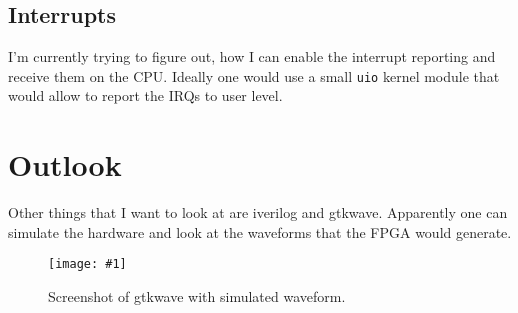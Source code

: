 \documentclass[%
  DIV19]{scrartcl}
\newcommand{\bild}[1]{\texttt{[image: \#1]}}
\begin{document}
\subsection{Interrupts}
I'm currently trying to figure out, how I can enable the interrupt
reporting and receive them on the CPU. Ideally one would use a small
\verb!uio! kernel module that would allow to report the IRQs to user
level.


\section{Outlook}
Other things that I want to look at are iverilog and
gtkwave. Apparently one can simulate the hardware and look at the
waveforms that the FPGA would generate.

\begin{figure}
  \centering
  \bild{screen_gtkwave.png}
  \caption{Screenshot of gtkwave with simulated waveform.}
\end{figure}
\end{document}

